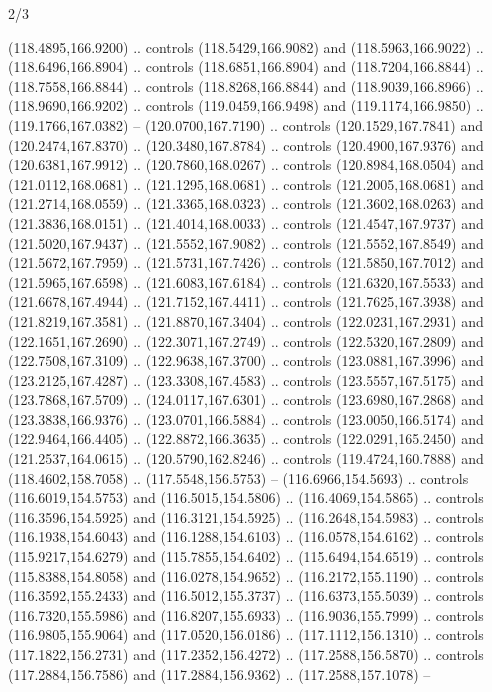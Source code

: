 \begin{flagdescription}{2/3}
\begin{scope}[shift={(0.5\flaglength,0.5)},scale=\flagwidth/320]
\begin{scope}[y=0.8pt, x=0.8pt, yscale=-1,shift={(-118.3,-146)}]
  (118.4895,166.9200) .. controls (118.5429,166.9082) and (118.5963,166.9022) ..
  (118.6496,166.8904) .. controls (118.6851,166.8904) and (118.7204,166.8844) ..
  (118.7558,166.8844) .. controls (118.8268,166.8844) and (118.9039,166.8966) ..
  (118.9690,166.9202) .. controls (119.0459,166.9498) and (119.1174,166.9850) ..
  (119.1766,167.0382) -- (120.0700,167.7190) .. controls (120.1529,167.7841) and
  (120.2474,167.8370) .. (120.3480,167.8784) .. controls (120.4900,167.9376) and
  (120.6381,167.9912) .. (120.7860,168.0267) .. controls (120.8984,168.0504) and
  (121.0112,168.0681) .. (121.1295,168.0681) .. controls (121.2005,168.0681) and
  (121.2714,168.0559) .. (121.3365,168.0323) .. controls (121.3602,168.0263) and
  (121.3836,168.0151) .. (121.4014,168.0033) .. controls (121.4547,167.9737) and
  (121.5020,167.9437) .. (121.5552,167.9082) .. controls (121.5552,167.8549) and
  (121.5672,167.7959) .. (121.5731,167.7426) .. controls (121.5850,167.7012) and
  (121.5965,167.6598) .. (121.6083,167.6184) .. controls (121.6320,167.5533) and
  (121.6678,167.4944) .. (121.7152,167.4411) .. controls (121.7625,167.3938) and
  (121.8219,167.3581) .. (121.8870,167.3404) .. controls (122.0231,167.2931) and
  (122.1651,167.2690) .. (122.3071,167.2749) .. controls (122.5320,167.2809) and
  (122.7508,167.3109) .. (122.9638,167.3700) .. controls (123.0881,167.3996) and
  (123.2125,167.4287) .. (123.3308,167.4583) .. controls (123.5557,167.5175) and
  (123.7868,167.5709) .. (124.0117,167.6301) .. controls (123.6980,167.2868) and
  (123.3838,166.9376) .. (123.0701,166.5884) .. controls (123.0050,166.5174) and
  (122.9464,166.4405) .. (122.8872,166.3635) .. controls (122.0291,165.2450) and
  (121.2537,164.0615) .. (120.5790,162.8246) .. controls (119.4724,160.7888) and
  (118.4602,158.7058) .. (117.5548,156.5753) -- (116.6966,154.5693) .. controls
  (116.6019,154.5753) and (116.5015,154.5806) .. (116.4069,154.5865) .. controls
  (116.3596,154.5925) and (116.3121,154.5925) .. (116.2648,154.5983) .. controls
  (116.1938,154.6043) and (116.1288,154.6103) .. (116.0578,154.6162) .. controls
  (115.9217,154.6279) and (115.7855,154.6402) .. (115.6494,154.6519) .. controls
  (115.8388,154.8058) and (116.0278,154.9652) .. (116.2172,155.1190) .. controls
  (116.3592,155.2433) and (116.5012,155.3737) .. (116.6373,155.5039) .. controls
  (116.7320,155.5986) and (116.8207,155.6933) .. (116.9036,155.7999) .. controls
  (116.9805,155.9064) and (117.0520,156.0186) .. (117.1112,156.1310) .. controls
  (117.1822,156.2731) and (117.2352,156.4272) .. (117.2588,156.5870) .. controls
  (117.2884,156.7586) and (117.2884,156.9362) .. (117.2588,157.1078) --

\end{scope}
\end{scope}
\end{flagdescription}

